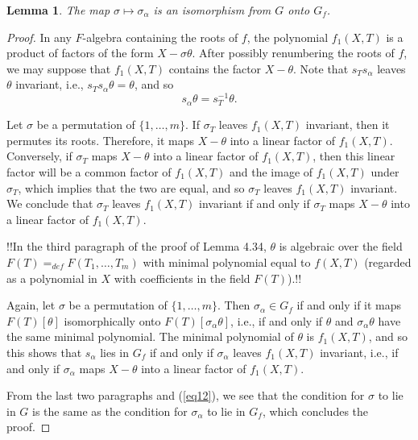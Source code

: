 \documentclass[a4paper,11pt,final,openany]{memoir}
\newtheorem{lemma}[X]{Lemma}
\theoremstyle{nonumberplain}
\newtheorem{proof}{Proof.}
\begin{document}
\begin{lemma}
\label{cg25}The map $\sigma\mapsto\sigma_{\alpha}$ is an isomorphism from $G$
onto $G_{f}$.
\end{lemma}

\begin{proof}
In any $F$-algebra containing the roots of $f$, the polynomial $f_{1}(X,T)$ is
a product of factors of the form $X-\sigma\theta$. After possibly renumbering
the roots of $f$, we may suppose that $f_{1}(X,T)$ contains the factor
$X-\theta$. Note that $s_{T}s_{\alpha}$ leaves $\theta$ invariant, i.e.,
$s_{T}s_{\alpha}\theta=\theta$, and so
\begin{equation}
s_{\alpha}\theta=s_{T}^{-1}\theta. \label{eq12}%
\end{equation}


Let $\sigma$ be a permutation of $\{1,\ldots,m\}$. If $\sigma_{T}$ leaves
$f_{1}(X,T)$ invariant, then it permutes its roots. Therefore, it maps
$X-\theta$ into a linear factor of $f_{1}(X,T)$. Conversely, if $\sigma_{T}$
maps $X-\theta$ into a linear factor of $f_{1}(X,T)$, then this linear factor
will be a common factor of $f_{1}(X,T)$ and the image of $f_{1}(X,T)$ under
$\sigma_{T}$, which implies that the two are equal, and so $\sigma_{T}$ leaves
$f_{1}(X,T)$ invariant. We conclude that $\sigma_{T}$ leaves $f_{1}(X,T)$
invariant if and only if $\sigma_{T}$ maps $X-\theta$ into a linear factor of
$f_{1}(X,T)$.

!!In the third paragraph of the proof of Lemma 4.34, $\theta$ is algebraic
over the field $F(T)=_{def} F(T_{1},\ldots,T_{m})$ with minimal polynomial
equal to $f(X,T)$ (regarded as a polynomial in $X$ with coefficients in the
field $F(T)$).!!

Again, let $\sigma$ be a permutation of $\{1,\ldots,m\}$. Then $\sigma
_{\alpha}\in G_{f}$ if and only if it maps $F(T)[\theta]$ isomorphically onto
$F(T)[\sigma_{\alpha}\theta]$, i.e., if and only if $\theta$ and
$\sigma_{\alpha}\theta$ have the same minimal polynomial. The minimal
polynomial of $\theta$ is $f_{1}(X,T)$, and so this shows that $s_{\alpha}$
lies in $G_{f}$ if and only if $\sigma_{\alpha}$ leaves $f_{1}(X,T)$
invariant, i.e., if and only if $\sigma_{\alpha}$ maps $X-\theta$ into a
linear factor of $f_{1}(X,T)$.

From the last two paragraphs and (\ref{eq12}), we see that the condition for
$\sigma$ to lie in $G$ is the same as the condition for $\sigma_{\alpha}$ to
lie in $G_{f}$, which concludes the proof.
\end{proof}
\end{document}
